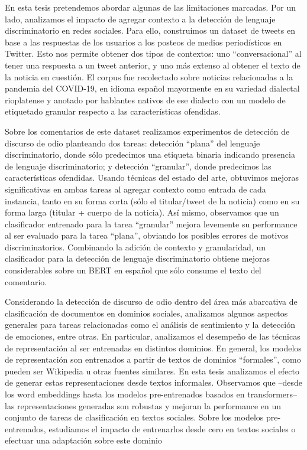 En esta tesis pretendemos abordar algunas de las limitaciones marcadas. Por un lado, analizamos el impacto de agregar contexto a la detección de lenguaje discriminatorio en redes sociales. Para ello, construimos un dataset de tweets en base a las respuestas de los usuarios a los posteos de medios periodísticos en Twitter. Esto nos permite obtener dos tipos de contextos: uno “conversacional” al tener una respuesta a un tweet anterior, y uno más extenso al obtener el texto de la noticia en cuestión. El corpus fue recolectado sobre noticias relacionadas a la pandemia del COVID-19, en idioma español mayormente en su variedad dialectal rioplatense y anotado por hablantes nativos de ese dialecto con un modelo de etiquetado granular respecto a las características ofendidas.

Sobre los comentarios de este dataset realizamos experimentos de detección de discurso de odio planteando dos tareas: detección “plana” del lenguaje discriminatorio, donde sólo predecimos una etiqueta binaria indicando presencia de lenguaje discriminatorio; y detección “granular”, donde predecimos las características ofendidas. Usando técnicas del estado del arte, obtuvimos mejoras significativas en ambas tareas al agregar contexto como entrada de cada instancia, tanto en su forma corta (sólo el titular/tweet de la noticia) como en su forma larga (titular + cuerpo de la noticia). Así mismo, observamos que un clasificador entrenado para la tarea “granular” mejora levemente su performance al ser evaluado para la tarea “plana”, obviando los posibles errores de motivos discriminatorios. Combinando la adición de contexto y granularidad, un clasificador para la detección de lenguaje discriminatorio obtiene mejoras considerables sobre un BERT en español que sólo consume el texto del comentario.

Considerando la detección de discurso de odio dentro del área más abarcativa de clasificación de documentos en dominios sociales, analizamos algunos aspectos generales para tareas relacionadas como el análisis de sentimiento y la detección de emociones, entre otras. En particular, analizamos el desempeño de las técnicas de representación al ser entrenadas en distintos dominios. En general, los modelos de representación son entrenados a partir de textos de dominios “formales”, como pueden ser Wikipedia u otras fuentes similares. En esta tesis analizamos el efecto de generar estas representaciones desde textos informales. Observamos que –desde los word embeddings hasta los modelos pre-entrenados basados en transformers– las representaciones generadas son robustas y mejoran la performance en un conjunto de tareas de clasificación en textos sociales. Sobre los modelos pre-entrenados, estudiamos el impacto de entrenarlos desde cero en textos sociales o efectuar una adaptación sobre este dominio

